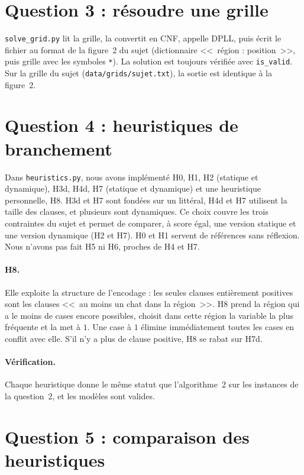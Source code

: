 \documentclass[11pt,a4paper]{article}
\newcommand{\f}[1]{\texttt{#1}}
\begin{document}
\section*{Question 3 : résoudre une grille}

\f{solve\_grid.py} lit la grille, la convertit en CNF, appelle DPLL, puis écrit le fichier au format de la figure~2 du sujet (dictionnaire <<~région : position~>>, puis grille avec les symboles \f{*}). La solution est toujours vérifiée avec \f{is\_valid}. Sur la grille du sujet (\f{data/grids/sujet.txt}), la sortie est identique à la figure~2.

\section*{Question 4 : heuristiques de branchement}

Dans \f{heuristics.py}, nous avons implémenté H0, H1, H2 (statique et dynamique), H3d, H4d, H7 (statique et dynamique) et une heuristique personnelle, H8. H3d et H7 sont fondées sur un littéral, H4d et H7 utilisent la taille des clauses, et plusieurs sont dynamiques. Ce choix couvre les trois contraintes du sujet et permet de comparer, à score égal, une version statique et une version dynamique (H2 et H7). H0 et H1 servent de références sans réflexion. Nous n'avons pas fait H5 ni H6, proches de H4 et H7.

\paragraph{H8.} Elle exploite la structure de l'encodage : les seules clauses entièrement positives sont les clauses <<~au moins un chat dans la région~>>. H8 prend la région qui a le moins de cases encore possibles, choisit dans cette région la variable la plus fréquente et la met à $1$. Une case à $1$ élimine immédiatement toutes les cases en conflit avec elle. S'il n'y a plus de clause positive, H8 se rabat sur H7d.

\paragraph{Vérification.} Chaque heuristique donne le même statut que l'algorithme~2 sur les instances de la question~2, et les modèles sont valides.

\section*{Question 5 : comparaison des heuristiques}
\end{document}
